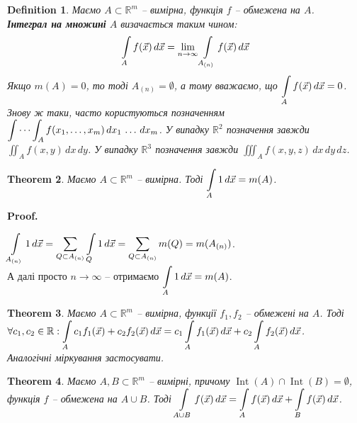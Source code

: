 \documentclass[a4paper, 10pt]{article}
\makeatletter
\def\qed{$\blacksquare$}
\theoremstyle{theoremdd}
\newtheorem{theorem}{Theorem}[subsection]
\theoremstyle{theoremdd}
\newtheorem{definition}[theorem]{Definition}
\theoremstyle{theoremdd}
\theoremstyle{theoremdd}
\theoremstyle{theoremdd}
\theoremstyle{theoremdd}
\theoremstyle{theoremdd}
\theoremstyle{theoremdd}
\renewenvironment{proof}[1][Proof.\\]{\par
\pushQED{\hfill \qed}%
\normalfont \topsep6\p@\@plus6\p@\relax
\trivlist
\item\relax
{\bfseries
#1\@addpunct{.}}\hspace\labelsep\ignorespaces
}{%
\popQED\endtrivlist\@endpefalse
}
\DeclareMathOperator{\Int}{Int}
\makeatother
\begin{document}
\begin{definition}
Маємо $A \subset \mathbb{R}^m$ -- вимірна, функція $f$ -- обмежена на $A$.\\
\textbf{Інтеграл на множині} $A$ визачається таким чином:
\begin{align*}
\int\displaylimits_A f(\vec{x})\,d\vec{x} = \lim_{n \to \infty} \int\displaylimits_{A_{(n)}} f(\vec{x})\,d\vec{x}
\end{align*}
Якщо $m(A) = 0$, то тоді $A_{(n)} = \emptyset$, а тому вважаємо, що $\displaystyle\int\displaylimits_A f(\vec{x})\,d\vec{x} = 0$.\\
Знову ж таки, часто користуються позначенням $\displaystyle\idotsint_A f(x_1,\dots,x_m)\,dx_1\,\dots\,dx_m$. У випадку $\mathbb{R}^2$ позначення завжди $\displaystyle\iint_A f(x,y)\,dx\,dy$. У випадку $\mathbb{R}^3$ позначення завжди $\displaystyle\iiint_A f(x,y,z)\,dx\,dy\,dz$.
\end{definition}

\begin{theorem}
Маємо $A \subset \mathbb{R}^m$ -- вимірна. Тоді $\displaystyle\int\displaylimits_A 1\,d\vec{x}  = m(A)$.
\end{theorem}

\begin{proof}
$\displaystyle\int\displaylimits_{A_{(n)}} 1\,d\vec{x} = \sum_{Q \subset A_{(n)}} \int\displaylimits_Q 1\,d\vec{x} = \sum_{Q \subset A_{(n)}} m(Q) = m(A_{(n)})$.\\
А далі просто $n \to \infty$ -- отримаємо $\displaystyle\int\displaylimits_A 1\,d\vec{x} = m(A)$.
\end{proof}

\begin{theorem}
Маємо $A \subset \mathbb{R}^m$ -- вимірна, функції $f_1,f_2$ -- обмежені на $A$. Тоді \\ $\forall c_1,c_2 \in \mathbb{R}: \displaystyle\int\displaylimits_A c_1 f_1(\vec{x}) + c_2 f_2(\vec{x})\,d\vec{x} = c_1 \int\displaylimits_A f_1(\vec{x}) \,d\vec{x} + c_2 \int\displaylimits_A f_2(\vec{x})\,d\vec{x}$.\\
\textit{Аналогічні міркування застосувати.}
\end{theorem}

\begin{theorem}
Маємо $A,B \subset \mathbb{R}^m$ -- вимірні, причому $\Int(A) \cap \Int(B) = \emptyset$, функція $f$ -- обмежена на $A \cup B$. Тоді $\displaystyle\int\displaylimits_{A \cup B} f(\vec{x})\,d\vec{x} = \int\displaylimits_{A} f(\vec{x})\,d\vec{x} + \int\displaylimits_{B} f(\vec{x})\,d\vec{x}$.
\end{theorem}
\end{document}
